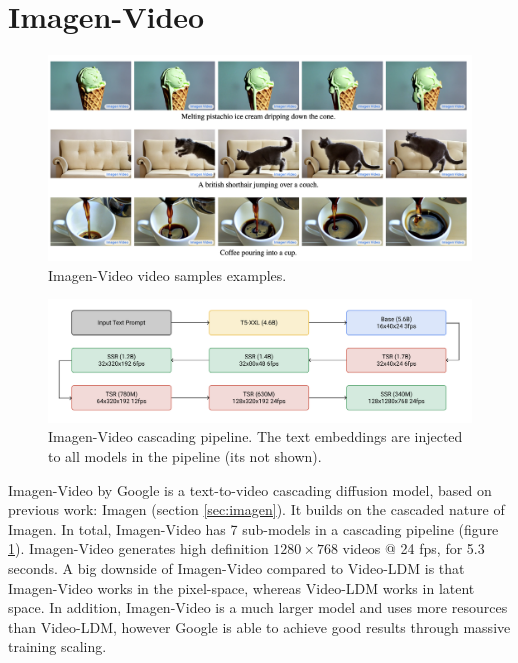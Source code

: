 \section{Imagen-Video}
\label{sec:imagen_video}

\begin{figure}
    \centering
    \includegraphics[width=1\textwidth]{images/video_synthesis/imagen_video.png}
    \caption{Imagen-Video video samples examples.}
\end{figure}

\begin{figure}
    \centering
    \includegraphics[width=1\textwidth]{images/imagen_video/pipeline.png}
    \caption{Imagen-Video cascading pipeline. The text embeddings are injected to all models in the pipeline (its not shown).}
    \label{fig:imagen_video_pipeline}
\end{figure}

Imagen-Video by Google \cite{imagen_video} is a text-to-video cascading diffusion model, based on previous work: Imagen (section \ref{sec:imagen}). It builds on the cascaded nature of Imagen. In total, Imagen-Video has 7 sub-models in a cascading pipeline (figure \ref{fig:imagen_video_pipeline}). Imagen-Video generates high definition $1280\times 768$ videos @ 24 fps, for 5.3 seconds. A big downside of Imagen-Video compared to Video-LDM is that Imagen-Video works in the pixel-space, whereas Video-LDM works in latent space. In addition, Imagen-Video is a much larger model and uses more resources than Video-LDM, however Google is able to achieve good results through massive training scaling.


